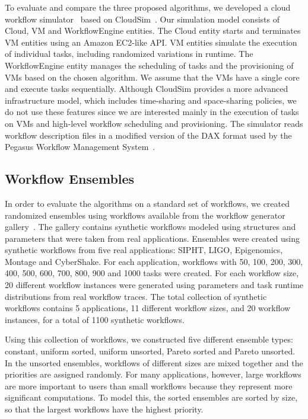 \documentclass[preprint,5p]{elsarticle}
\begin{document}
To evaluate and compare the three proposed algorithms, we developed a cloud
workflow simulator~\cite{CloudWorkflowSimulator} based on CloudSim~\cite{Calheiros2011}. Our
simulation model consists of Cloud, VM and WorkflowEngine entities. The Cloud entity starts and
terminates VM entities using an Amazon EC2-like API. VM entities simulate the
execution of individual tasks, including randomized variations in runtime. The
WorkflowEngine entity manages the scheduling of tasks and the provisioning of 
VMs based on the chosen algorithm. We assume that the VMs have a single core
and execute tasks sequentially. 
Although CloudSim provides a more advanced infrastructure model, which includes
time-sharing and space-sharing policies, we do not use these features since we
are interested mainly in the execution of tasks on VMs and high-level workflow
scheduling and provisioning. 
The simulator reads workflow description files in
a modified version of the DAX format used by the Pegasus Workflow Management
System~\cite{Deelman2005}. 


\subsection{Workflow Ensembles}
\label{sec:ensembles}


In order to evaluate the algorithms on a standard set of workflows, we created
randomized ensembles using workflows available from the workflow generator
gallery~\cite{WorkflowGenerator}. The
gallery contains synthetic workflows modeled using structures and parameters
that were taken from real applications. Ensembles were created using synthetic
workflows from five real applications: SIPHT, LIGO, Epigenomics, Montage and
CyberShake. For each application, workflows with 50, 100, 200, 300,
400, 500, 600, 700, 800, 900 and 1000 tasks were created. For each workflow
size, 20 different workflow instances were generated using parameters and task
runtime distributions from real workflow traces. The total collection of
synthetic workflows contains 5 applications, 11 different workflow sizes, and 20
workflow instances, for a total of 1100 synthetic workflows.


Using this collection of workflows, we constructed five different ensemble types:
constant, uniform sorted, uniform unsorted, Pareto sorted and Pareto unsorted.
In the unsorted ensembles, workflows of different sizes are mixed together and
the priorities are assigned randomly.
For many applications, however, large workflows are
more important to users than small workflows because they represent more
significant computations. To model this, the sorted ensembles are sorted by
size, so that the largest workflows have the highest priority.
\end{document}
